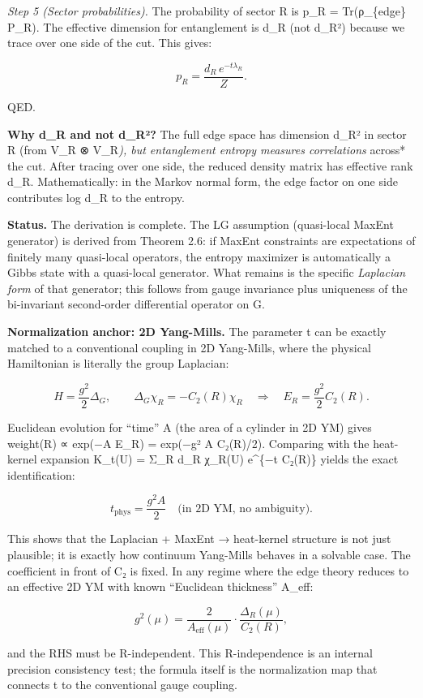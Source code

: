 \documentclass[
]{article}
\begin{document}
\emph{Step 5 (Sector probabilities).} The probability of sector R is
p\_R = Tr(ρ\_\{edge\} P\_R). The effective dimension for entanglement is
d\_R (not d\_R²) because we trace over one side of the cut. This gives:

\[
p_R = \frac{d_R \, e^{-t \lambda_R}}{Z}.
\]

QED.

\textbf{Why d\_R and not d\_R²?} The full edge space has dimension d\_R²
in sector R (from V\_R ⊗ V\_R\emph{), but entanglement entropy measures
correlations }across* the cut. After tracing over one side, the reduced
density matrix has effective rank d\_R. Mathematically: in the Markov
normal form, the edge factor on one side contributes log d\_R to the
entropy.

\textbf{Status.} The derivation is complete. The LG assumption
(quasi-local MaxEnt generator) is derived from Theorem 2.6: if MaxEnt
constraints are expectations of finitely many quasi-local operators, the
entropy maximizer is automatically a Gibbs state with a quasi-local
generator. What remains is the specific \emph{Laplacian form} of that
generator; this follows from gauge invariance plus uniqueness of the
bi-invariant second-order differential operator on G.

\textbf{Normalization anchor: 2D Yang-Mills.} The parameter t can be
exactly matched to a conventional coupling in 2D Yang-Mills, where the
physical Hamiltonian is literally the group Laplacian:

\[
H = \frac{g^2}{2} \Delta_G, \qquad
\Delta_G \chi_R = -C_2(R) \chi_R
\quad \Rightarrow \quad
E_R = \frac{g^2}{2} C_2(R).
\]

Euclidean evolution for ``time'' A (the area of a cylinder in 2D YM)
gives weight(R) ∝ exp(−A E\_R) = exp(−g² A C₂(R)/2). Comparing with the
heat-kernel expansion K\_t(U) = Σ\_R d\_R χ\_R(U) e\^{}\{−t C₂(R)\}
yields the exact identification:

\[
t_\mathrm{phys} = \frac{g^2 A}{2} \quad \text{(in 2D YM, no ambiguity).}
\]

This shows that the Laplacian + MaxEnt → heat-kernel structure is not
just plausible; it is exactly how continuum Yang-Mills behaves in a
solvable case. The coefficient in front of C₂ is fixed. In any regime
where the edge theory reduces to an effective 2D YM with known
``Euclidean thickness'' A\_eff:

\[
g^2(\mu) = \frac{2}{A_\mathrm{eff}(\mu)} \cdot \frac{\Delta_R(\mu)}{C_2(R)},
\]

and the RHS must be R-independent. This R-independence is an internal
precision consistency test; the formula itself is the normalization map
that connects t to the conventional gauge coupling.
\end{document}
